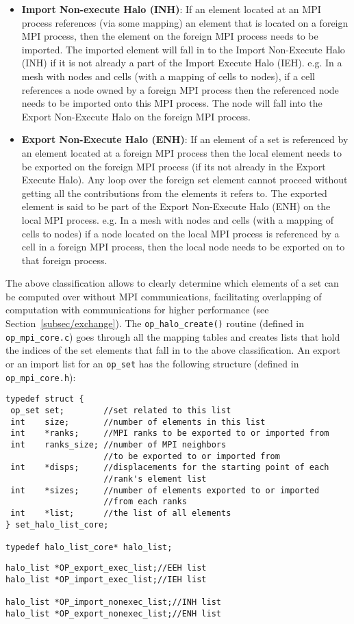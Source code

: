 \documentclass[12pt]{article}
\begin{document}
\begin{itemize}
\item \textbf{Import Non-execute Halo (INH)}: If an element located at an MPI process references (via some mapping) an
element that is located on a foreign MPI process, then the element on the foreign MPI process needs to be imported. The
imported element will fall in to the Import Non-Execute Halo (INH) if it is not already a part of the Import Execute
Halo (IEH). e.g. In a mesh with nodes and cells (with a mapping of cells to nodes), if a cell references a node owned by
a foreign MPI process then the referenced node needs to be imported onto this MPI process. The node will fall into the
Export Non-Execute Halo on the foreign MPI process.

\item \textbf{Export Non-Execute Halo (ENH)}: If an element of a set is referenced by an element located at a foreign
MPI process then the local element needs to be exported on the foreign MPI process (if its not already in the Export
Execute Halo). Any loop over the foreign set element cannot proceed without getting all the contributions from the
elements it refers to. The exported element is said to be part of the Export Non-Execute Halo (ENH) on the local MPI
process. e.g. In a mesh with nodes and cells (with a mapping of cells to nodes) if a node located on the local MPI
process is referenced by a cell in a foreign MPI process, then the local node needs to be exported on to that foreign
process. 
\end{itemize}

\noindent The above classification allows to clearly determine which elements of a set can be computed over without MPI
communications, facilitating overlapping of computation with communications for higher performance (see
Section~\ref{subsec/exchange}). The \texttt{op\_halo\_create()} routine (defined in \texttt{op\_mpi\_core.c}) goes
through all the mapping tables and creates lists that hold the indices of the set elements that fall in to the above
classification. An export or an import list for an \texttt{op\_set} has the following structure (defined in
\texttt{op\_mpi\_core.h}):

\begin{verbatim}
typedef struct {
 op_set set;        //set related to this list
 int    size;       //number of elements in this list                                
 int    *ranks;     //MPI ranks to be exported to or imported from
 int    ranks_size; //number of MPI neighbors 
                    //to be exported to or imported from
 int    *disps;     //displacements for the starting point of each 
                    //rank's element list 
 int    *sizes;     //number of elements exported to or imported 
                    //from each ranks
 int    *list;      //the list of all elements 
} set_halo_list_core;

typedef halo_list_core* halo_list;
\end{verbatim}
\begin{verbatim}
halo_list *OP_export_exec_list;//EEH list
halo_list *OP_import_exec_list;//IEH list

halo_list *OP_import_nonexec_list;//INH list
halo_list *OP_export_nonexec_list;//ENH list 
\end{verbatim} 
\end{document}
